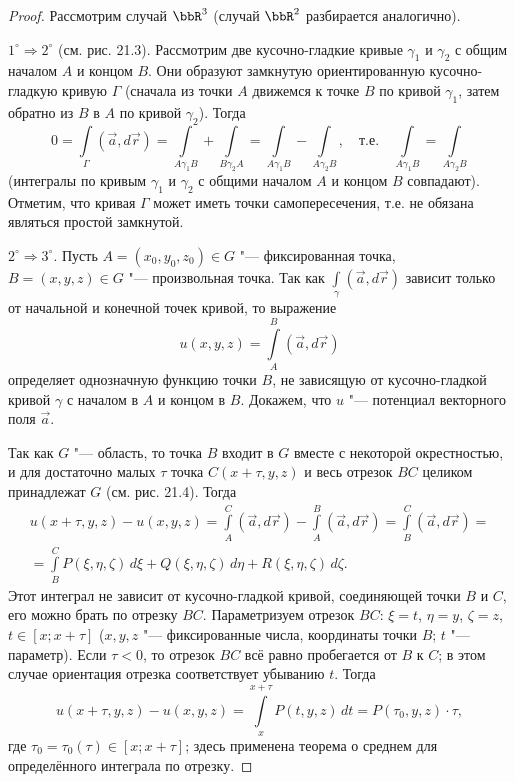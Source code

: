 \begin{proof}
Рассмотрим случай $\bbR^3$ (случай $\bbR^2$ разбирается аналогично).

$1^\circ \Rightarrow 2^\circ$ (см. рис. 21.3). Рассмотрим две кусочно-гладкие кривые $\gamma_1$ и $\gamma_2$ с общим началом $A$ и концом $B$. Они образуют замкнутую ориентированную кусочно-гладкую кривую $\Gamma$ (сначала из точки $A$ движемся к точке $B$ по кривой $\gamma_1$, затем обратно из $B$ в $A$ по кривой $\gamma_2$). Тогда
$$
0 = \int\limits_\Gamma (\vec{a}, d\vec{r}) = \int\limits_{A\gamma_1 B} + \int\limits_{B\gamma_2 A} = \int\limits_{A\gamma_1 B} - \int\limits_{A\gamma_2 B}, \quad \text{т.е.} \quad \int\limits_{A\gamma_1 B} = \int\limits_{A\gamma_2 B}
$$
(интегралы по кривым $\gamma_1$ и $\gamma_2$ с общими началом $A$ и концом $B$ совпадают). Отметим, что кривая $\Gamma$ может иметь точки самопересечения, т.е. не обязана являться простой замкнутой.

$2^\circ \Rightarrow 3^\circ$. Пусть $A = (x_0, y_0, z_0) \in G$ "--- фиксированная точка, $B = (x, y, z) \in G$ "--- произвольная точка. Так как $\int\limits_\gamma (\vec{a}, d\vec{r})$ зависит только от начальной и конечной точек кривой, то выражение
$$
u(x, y, z) = \int\limits_A^B (\vec{a}, d\vec{r})
$$
определяет однозначную функцию точки $B$, не зависящую от кусочно-гладкой кривой $\gamma$ с началом в $A$ и концом в $B$. Докажем, что $u$ "--- потенциал векторного поля $\vec{a}$.

Так как $G$ "--- область, то точка $B$ входит в $G$ вместе с некоторой окрестностью, и для достаточно малых $\tau$ точка $C(x + \tau, y, z)$ и весь отрезок $BC$ целиком принадлежат $G$ (см. рис. 21.4). Тогда
\begin{multline*}
u(x + \tau, y, z) - u(x, y, z) = \int\limits_A^C (\vec{a}, d\vec{r}) - \int\limits_A^B (\vec{a}, d\vec{r}) = \int\limits_B^C (\vec{a}, d\vec{r}) = \\
= \int\limits_B^C P(\xi, \eta, \zeta)\,d\xi + Q(\xi, \eta, \zeta)\,d\eta + R(\xi, \eta, \zeta)\,d\zeta.
\end{multline*}
Этот интеграл не зависит от кусочно-гладкой кривой, соединяющей точки $B$ и $C$, его можно брать по отрезку $BC$. Параметризуем отрезок $BC$: $\xi = t$, $\eta = y$, $\zeta = z$, $t \in [x; x + \tau]$ ($x, y, z$ "--- фиксированные числа, координаты точки $B$; $t$ "--- параметр). Если $\tau < 0$, то отрезок $BC$ всё равно пробегается от $B$ к $C$; в этом случае ориентация отрезка соответствует убыванию $t$. Тогда
$$
u(x + \tau, y, z) - u(x, y, z) = \int\limits_x^{x + \tau} P(t, y, z)\,dt = P(\tau_0, y, z) \cdot \tau,
$$
где $\tau_0 = \tau_0(\tau) \in [x; x + \tau]$; здесь применена теорема о среднем для определённого интеграла по отрезку.


\end{proof}
